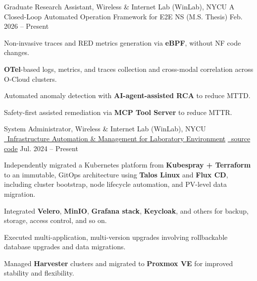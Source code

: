 
\begin{cventries}

  \cventry
    {Graduate Research Assistant, Wireless \& Internet Lab (WinLab), NYCU} %
    {A Closed-Loop Automated Operation Framework for E2E NS (M.S. Thesis)} %
    {} %
    {Feb. 2026 -- Present} %
    {
      \begin{cvitems}
        \item {Non-invasive traces and RED metrics generation via \textbf{eBPF}, without NF code changes.}
        \item {\textbf{OTel}-based logs, metrics, and traces collection and cross-modal correlation across O-Cloud clusters.}
        \item {Automated anomaly detection with \textbf{AI-agent-assisted RCA} to reduce MTTD.}
        \item {Safety-first assisted remediation via \textbf{MCP Tool Server} to reduce MTTR.}
      \end{cvitems}
    }

  \cventry
    {System Administrator, Wireless \& Internet Lab (WinLab), NYCU} %
    {\href{https://github.com/ChesterChuTw/winfra-cluster-management}
    {\faGithub\ Infrastructure Automation \& Management for Laboratory Environment}}
    {\href{https://github.com/ChesterChuTw/winfra-cluster-management}{\faGithub\ source code}} %
    {Jul. 2024 -- Present} %
    {
      \begin{cvitems}
        \item {Independently migrated a Kubernetes platform from \textbf{Kubespray + Terraform} to an immutable, GitOps architecture using \textbf{Talos Linux} and \textbf{Flux CD}, including cluster bootstrap, node lifecycle automation, and PV-level data migration.}
        \item {Integrated \textbf{Velero}, \textbf{MinIO}, \textbf{Grafana stack}, \textbf{Keycloak}, and others for backup, storage, access control, and so on.}
        \item {Executed multi-application, multi-version upgrades involving rollbackable database upgrades and data migrations.}
        \item {Managed \textbf{Harvester} clusters and migrated to \textbf{Proxmox VE} for improved stability and flexibility.}
      \end{cvitems}
    }


\end{cventries}

